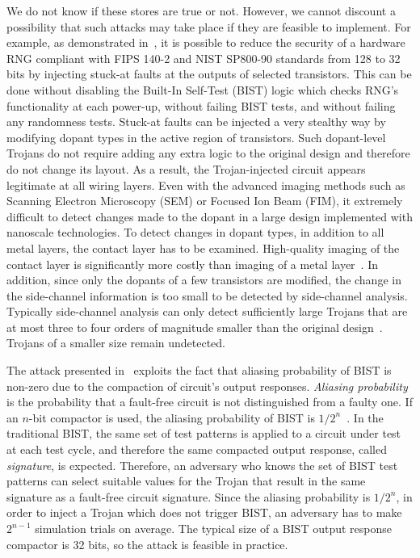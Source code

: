 \documentclass[a4paper]{llncs}
\begin{document}
We do not know if these stores are true or not. However, we cannot discount a possibility that such attacks may take place if they are feasible to implement.
For example, as demonstrated in~\cite{BeRPB13}, it is possible to reduce the security of a hardware RNG compliant with FIPS 140-2 and NIST SP800-90 standards from 128 to 32 bits by injecting stuck-at faults at the outputs of selected transistors. This can be done without disabling the Built-In Self-Test (BIST) logic which checks RNG's functionality at each power-up, without failing BIST tests, and without failing any randomness tests. 
Stuck-at faults can be injected a very stealthy way by modifying dopant types in the active region of transistors. Such dopant-level Trojans do not require adding any extra logic to the original design and therefore do not change its layout. As a result, the Trojan-injected circuit appears legitimate at all wiring layers. Even with the advanced imaging methods such as 
Scanning Electron Microscopy (SEM) or Focused Ion Beam (FIM), it extremely difficult to detect changes made to the dopant in a large design implemented with nanoscale technologies. To detect changes in dopant types, in addition to all metal layers, the contact layer has to be examined. High-quality imaging of the contact layer is significantly more costly than imaging of a metal layer~\cite{SuSFT14}. In addition, since only the dopants of a few transistors are modified, the change in the side-channel information is too small to be detected by side-channel analysis. Typically side-channel analysis can only detect sufficiently large Trojans that are at most three to four orders of magnitude smaller than the original design~\cite{AgBKRS07}. Trojans of a smaller size remain undetected.

The attack presented in~\cite{BeRPB13} exploits the fact that aliasing probability of BIST is non-zero due to the compaction of circuit's output responses. 
{\em Aliasing probability} is the probability that a fault-free circuit is not distinguished from a faulty one. If an $n$-bit compactor is used, the aliasing probability of BIST is $1/2^n$~\cite{DaOFE90}. In the traditional BIST, the same set of test patterns is applied to a circuit under test at each test cycle, and therefore the same compacted output response, called {\em signature}, is expected. 
Therefore, an adversary who knows the set of BIST test patterns can select suitable values for the Trojan that result in the same signature as a fault-free circuit signature. Since the aliasing probability is $1/2^n$, in order to inject a Trojan which does not trigger BIST, an adversary has to make $2^{n-1}$ simulation trials on average. The typical size of a BIST output response compactor
is 32 bits, so the attack is feasible in practice.
\end{document}
